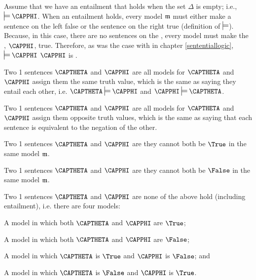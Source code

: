 Assume that we have an entailment that holds when the set $\Delta$ is empty; i.e., $\sdtstile{}{}\CAPPHI$.  When an entailment holds, every model $\mathfrak{m}$ must either make a sentence on the left false or the sentence on the right true (definition of $\sdtstile{}{}$).  Because, in this case, there are no sentences on the , every model must make the , $\CAPPHI$, true.  Therefore, as was the case with \GSL{} in chapter \ref{sententiallogic}, $\sdtstile{}{}\CAPPHI$ \Iff $\CAPPHI$ is .

\begin{majorILnc}{}
Two \GQL{}1 sentences $\CAPTHETA$ and $\CAPPHI$ are  \Iff all models for $\CAPTHETA$ and $\CAPPHI$ assign them the same truth value, which is the same as saying they entail each other, i.e. $\CAPTHETA\sdtstile{}{}\CAPPHI$ and $\CAPPHI\sdtstile{}{}\CAPTHETA$.
\end{majorILnc}
\begin{majorILnc}{}
Two \GQL{}1 sentences $\CAPTHETA$ and $\CAPPHI$ are  \Iff all models for $\CAPTHETA$ and $\CAPPHI$ assign them opposite truth values, which is the same as saying that each sentence is equivalent to the negation of the other.
\end{majorILnc}
\begin{majorILnc}{}
Two \GQL{}1 sentences $\CAPTHETA$ and $\CAPPHI$ are  \Iff they cannot both be $\True$ in the same model $\mathfrak{m}$.
\end{majorILnc}
\begin{majorILnc}{}
Two \GQL{}1 sentences $\CAPTHETA$ and $\CAPPHI$ are  \Iff they cannot both be $\False$ in the same model $\mathfrak{m}$.
\end{majorILnc}
\begin{majorILnc}{}
Two \GQL{}1 sentences $\CAPTHETA$ and $\CAPPHI$ are  \Iff none of the above hold (including entailment), i.e. \Iff there are four models:
\begin{cenumerate}
	\item A model in which both $\CAPTHETA$ and $\CAPPHI$ are $\True$; 
	\item A model in which both $\CAPTHETA$ and $\CAPPHI$ are $\False$;
	\item A model in which $\CAPTHETA$ is $\True$ and $\CAPPHI$ is $\False$; and
	\item A model in which $\CAPTHETA$ is $\False$ and $\CAPPHI$ is $\True$.
\end{cenumerate}
\end{majorILnc}

